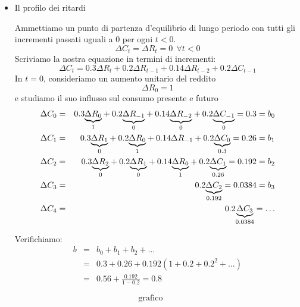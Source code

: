 \documentclass[a4paper]{report}
\newcounter{ese}
\theoremstyle{remark}
\begin{document}
\begin{itemize}
\item Il profilo dei ritardi

Ammettiamo un punto di partenza d'equilibrio di lungo periodo con tutti gli
incrementi passati uguali a 0 per ogni $t<0$.%
\begin{equation*}
\Delta C_{t}=\Delta R_{t}=0\ \ \forall t<0
\end{equation*}%
Scriviamo la nostra equazione in termini di incrementi:%
\begin{equation*}
\Delta C_{t}=0.3\Delta R_{t}+0.2\Delta R_{t-1}+0.14\Delta R_{t-2}+0.2\Delta
C_{t-1}
\end{equation*}%
In $t=0$, consideriamo un aumento unitario del reddito%
\begin{equation*}
\Delta R_{0}=1
\end{equation*}%
e studiamo il suo influsso sul consumo presente e futuro%
\begin{eqnarray*}
\Delta C_{0} &=&0.3\underset{1}{\underbrace{\Delta R_{0}}}+0.2\underset{0}{%
\underbrace{\Delta R_{-1}}}+0.14\underset{0}{\underbrace{\Delta R_{-2}}}+0.2%
\underset{0}{\underbrace{\Delta C_{-1}}}=0.3=b_{0} \\
\Delta C_{1} &=&0.3\underset{0}{\underbrace{\Delta R_{1}}}+0.2\underset{1}{%
\underbrace{\Delta R_{0}}}+0.14\Delta R_{-1}+0.2\underset{0.3}{\underbrace{%
\Delta C_{0}}}=0.26=b_{1} \\
\Delta C_{2} &=&0.3\underset{0}{\underbrace{\Delta R_{2}}}+0.2\underset{0}{%
\underbrace{\Delta R_{1}}}+0.14\underset{1}{\underbrace{\Delta R_{0}}}+0.2%
\underset{0.26}{\underbrace{\Delta C_{1}}}=0.192=b_{2} \\
\Delta C_{3} &=&0.2\underset{0.192}{\underbrace{\Delta C_{2}}}=0.0384=b_{3}
\\
\Delta C_{4} &=&0.2\underset{0.0384}{\underbrace{\Delta C_{3}}}=\ldots
\end{eqnarray*}

Verifichiamo:%
\begin{eqnarray*}
b &=&b_{0}+b_{1}+b_{2}+\ldots \\
&=&0.3+0.26+0.192\left( 1+0.2+0.2^{2}+\ldots \right) \\
&=&0.56+\frac{0.192}{1-0.2}=0.8
\end{eqnarray*}
\end{itemize}

\begin{equation*}
\text{grafico}
\end{equation*}%
\vspace{5cm}
\end{document}
